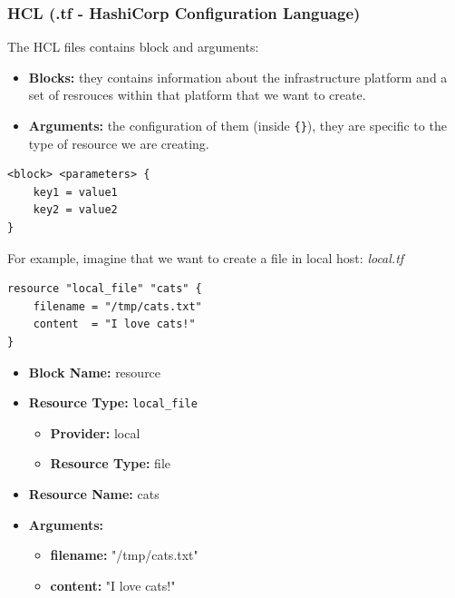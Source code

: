 \documentclass{article}
\newenvironment{codetemplate}[1][]{%
  \mybasecolorbox[#1]
  \itshape
}{%
  \endmybasecolorbox
}
\begin{document}
\subsubsection{HCL (.tf - HashiCorp Configuration Language)}
The HCL files contains block and arguments:
\begin{itemize}
    \item \textbf{Blocks:} they contains information about the infrastructure platform and a set of resrouces within that platform that we want to create.
    \item \textbf{Arguments:} the configuration of them (inside \verb|{}|), they are specific to the type of resource we are creating.
\end{itemize}

\begin{codetemplate}{}
\begin{verbatim}
<block> <parameters> {
    key1 = value1
    key2 = value2
}
\end{verbatim}
\end{codetemplate}

For example, imagine that we want to create a file in local host:
\begin{codetemplate}{local.tf}
\begin{verbatim}
resource "local_file" "cats" {
    filename = "/tmp/cats.txt"
    content  = "I love cats!"
}
\end{verbatim}
\end{codetemplate}

\begin{itemize}
    \item \textbf{Block Name:} resource
    \item \textbf{Resource Type:} \verb+local_file+ 
    \begin{itemize}
        \item \textbf{Provider:} local
        \item \textbf{Resource Type:} file
    \end{itemize}
    \item \textbf{Resource Name:} cats
    \item \textbf{Arguments:}
    \begin{itemize}
        \item \textbf{filename:} "/tmp/cats.txt"
        \item \textbf{content:} "I love cats!"
    \end{itemize}
\end{itemize}
\end{document}
